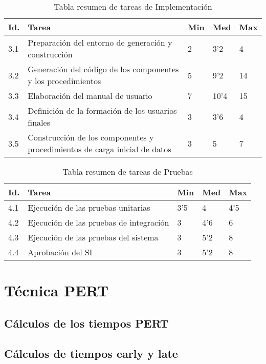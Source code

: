 \documentclass[11pt,a4paper,spanish,twoside]{report}
\begin{document}
\begin{table}[!h]
\centering
  \begin{tabular}{|p{0.8cm}||p{8cm}||p{0.75cm}|p{0.75cm}|p{0.75cm}|}
    \hline
    \textbf{Id.} & \textbf{Tarea} & \textbf{Min} &
    \textbf{Med} & \textbf{Max}\\
    \hline
    3.1 & Preparación del entorno de generación y construcción & 2 & 3'2  & 4 \\
    \hline
    3.2 & Generación del código de los componentes y los procedimientos & 5 &
    9'2 & 14\\
    \hline
    3.3 & Elaboración del manual de usuario & 7 & 10'4 & 15\\
    \hline
    3.4 & Definición de la formación de los usuarios finales & 3 & 3'6 & 4 \\
    \hline
    3.5 & Construcción de los componentes y procedimientos de carga inicial
    de datos & 3 & 5 & 7\\
    \hline
  \end{tabular}
  \caption{Tabla resumen de tareas de Implementación} \label{Tab:tareas3}
\end{table}

\begin{table}[!h]
\centering
  \begin{tabular}{|p{0.8cm}||p{8cm}||p{0.75cm}|p{0.75cm}|p{0.75cm}|}
    \hline
    \textbf{Id.} & \textbf{Tarea} & \textbf{Min} &
    \textbf{Med} & \textbf{Max}\\
    \hline
    4.1 & Ejecución de las pruebas unitarias & 3'5 & 4 & 4'5\\
    \hline
    4.2 & Ejecución de las pruebas de integración & 3 & 4'6 & 6\\
    \hline
    4.3 & Ejecución de las pruebas del sistema & 3 & 5'2 & 8\\
    \hline
    4.4 & Aprobación del SI & 3 & 5'2 & 8 \\
    \hline
  \end{tabular}
  \caption{Tabla resumen de tareas de Pruebas} \label{Tab:tareas4}
\end{table}


\chapter{Técnica PERT}
\section{Cálculos de los tiempos PERT}
\section{Cálculos de tiempos early y late}
\end{document}
